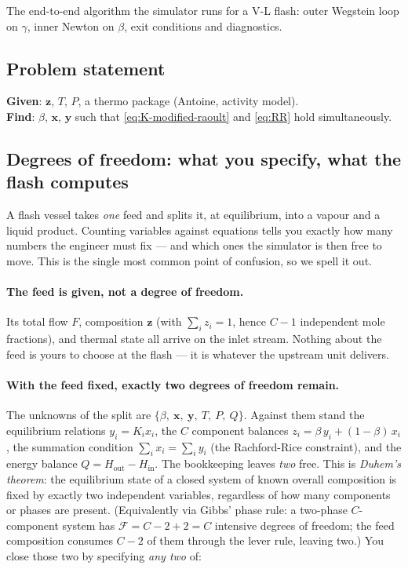 \documentclass[11pt,a4paper]{article}
\newcommand{\xv}{\mathbf{x}}
\newcommand{\yv}{\mathbf{y}}
\newcommand{\zv}{\mathbf{z}}
\begin{document}
\begin{whatyoulllearn}
The end-to-end algorithm the simulator runs for a V-L flash: outer
Wegstein loop on $\gamma$, inner Newton on $\beta$, exit conditions and
diagnostics.
\end{whatyoulllearn}

\subsection{Problem statement}

\textbf{Given}: $\zv$, $T$, $P$, a thermo package (Antoine,
activity model). \\
\textbf{Find}: $\beta$, $\xv$, $\yv$ such that
\eqref{eq:K-modified-raoult} and \eqref{eq:RR} hold simultaneously.

\subsection{Degrees of freedom: what you specify, what the flash computes}

A flash vessel takes \emph{one} feed and splits it, at equilibrium, into a
vapour and a liquid product.  Counting variables against equations tells you
exactly how many numbers the engineer must fix --- and which ones the simulator
is then free to move.  This is the single most common point of confusion, so we
spell it out.

\paragraph{The feed is given, not a degree of freedom.}  Its total flow $F$,
composition $\zv$ (with $\sum_i z_i = 1$, hence $C-1$ independent mole
fractions), and thermal state all arrive on the inlet stream.  Nothing about
the feed is yours to choose at the flash --- it is whatever the upstream unit
delivers.

\paragraph{With the feed fixed, exactly two degrees of freedom remain.}  The
unknowns of the split are $\{\beta,\ \xv,\ \yv,\ T,\ P,\ Q\}$.  Against them
stand the equilibrium relations $y_i = K_i x_i$, the $C$ component balances
$z_i = \beta\, y_i + (1-\beta)\, x_i$, the summation condition
$\sum_i x_i = \sum_i y_i$ (the Rachford-Rice constraint), and the energy balance
$Q = H_{\text{out}} - H_{\text{in}}$.  The bookkeeping leaves \emph{two} free.
This is \emph{Duhem's theorem}: the equilibrium state of a closed system of known
overall composition is fixed by exactly two independent variables, regardless of
how many components or phases are present.  (Equivalently via Gibbs' phase rule: a
two-phase $C$-component system has $\mathcal F = C - 2 + 2 = C$ intensive degrees
of freedom; the feed composition consumes $C-2$ of them through the lever rule,
leaving two.)  You close those two by specifying \emph{any two} of:
\end{document}
